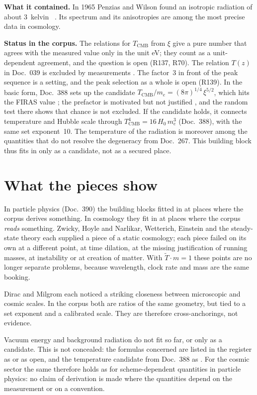 \textbf{What it contained.} In 1965 Penzias and Wilson found an isotropic radiation of about
$3$~kelvin \QM~\cite{PenziasWilson1965}. Its spectrum and its anisotropies are among the most precise
data in cosmology.

\textbf{Status in the corpus.} The relations for $T_{\mathrm{CMB}}$ from $\xi$ give a pure number
that agrees with the measured value only in the unit eV; they count as a unit-dependent agreement,
and the question is open (R137, R70). The relation $T(z)$ in Doc.~039 is excluded by measurements
\XM. The factor~3 in front of the peak sequence is a setting, and the peak selection as a whole is
open (R139). In the basic form, Doc.~388 sets up the candidate
$T_{\mathrm{CMB}}/m_e=(8\pi)^{1/4}\,\xi^{5/2}$, which hits the FIRAS value \KM; the prefactor is
motivated but not justified \SM, and the random test there shows that chance is not excluded. If the
candidate holds, it connects temperature and Hubble scale through $T_{\mathrm{CMB}}^4=16\,H_0\,m_e^3$
\BM{} (Doc.~388), with the same set exponent~10. The temperature of the radiation is moreover among
the quantities that do not resolve the degeneracy from Doc.~267. This building block thus fits in
only as a candidate, not as a secured place.

\section{What the pieces show}

In particle physics (Doc.~390) the building blocks fitted in at places where the corpus derives
something. In cosmology they fit in at places where the corpus \emph{reads} something. Zwicky, Hoyle
and Narlikar, Wetterich, Einstein and the steady-state theory each supplied a piece of a static
cosmology; each piece failed on its own at a different point, at time dilation, at the missing
justification of running masses, at instability or at creation of matter. With $\tilde T\cdot m=1$
these points are no longer separate problems, because wavelength, clock rate and mass are the same
booking.

Dirac and Milgrom each noticed a striking closeness between microscopic and cosmic scales. In the
corpus both are ratios of the same geometry, but tied to a set exponent and a calibrated scale. They
are therefore cross-anchorings, not evidence.

Vacuum energy and background radiation do not fit so far, or only as a candidate. This is not
concealed: the formulas concerned are listed in the register as \XM{} or as open, and the temperature
candidate from Doc.~388 as \SM. For the cosmic sector the same therefore holds as for
scheme-dependent quantities in particle physics: no claim of derivation is made where the quantities
depend on the measurement or on a convention.

